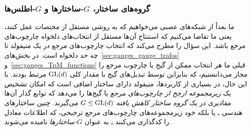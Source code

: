 \subsubsection{گروه‌های ساختار، \textit{$G$}-ساختارها و \textit{$G$}-اطلس‌ها}
\label{sec:local_G-structure_G-atlas}

ما بعداً از شبکه‌های عصبی می‌خواهیم که به روشی مستقل از مختصات عمل کنند، یعنی ما تقاضا می‌کنیم که استنتاج آن‌ها مستقل از انتخاب‌های دلخواه چارچوب‌های مرجع باشد.
این سؤال را مطرح می‌کند که انتخاب چارچوب‌های مرجع در یک منیفولد تا چه حد دلخواه است.
در بخش‌های~\ref{sec:gauges_gauge_trafos} و~\ref{sec:gauges_TpM_functions} قبلی ما هر انتخاب ممکن از گیج یا چارچوب مرجع را مجاز می‌دانستیم، که بنابراین توسط تبدیل‌های گیج با مقدار کلی $\operatorname{GL}(d)$ مرتبط بودند.
با این حال، در بسیاری از کاربردها، منیفولد دارای ساختار اضافی است که امکان تشخیص یک \emph{زیرمجموعه ارجح از چارچوب‌های مرجع} یا گیج‌ها را می‌دهد که توابع گذار آن‌ها مقادیری در یک \emph{گروه ساختار کاهش یافته} $G\leq\operatorname{GL}(d)$ می‌گیرند.
چنین ساختارهای هندسی ـ یا بلکه خود زیرمجموعه‌های چارچوب‌های مرجع ترجیحی، که اطلاعات معادل را کدگذاری می‌کنند ـ به عنوان \emph{$G$-ساختارها} نامیده می‌شوند.


